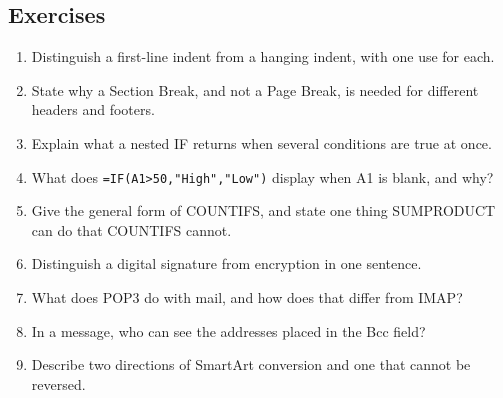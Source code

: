 \documentclass[11pt]{article}
\begin{document}
\subsection*{Exercises}
\begin{enumerate}[label=\arabic*.]
  \item Distinguish a first-line indent from a hanging indent, with one use
    for each.
  \item State why a Section Break, and not a Page Break, is needed for
    different headers and footers.
  \item Explain what a nested IF returns when several conditions are true at
    once.
  \item What does \texttt{=IF(A1>50,"High","Low")} display when A1 is blank,
    and why?
  \item Give the general form of COUNTIFS, and state one thing SUMPRODUCT can
    do that COUNTIFS cannot.
  \item Distinguish a digital signature from encryption in one sentence.
  \item What does POP3 do with mail, and how does that differ from IMAP?
  \item In a message, who can see the addresses placed in the Bcc field?
  \item Describe two directions of SmartArt conversion and one that cannot be
    reversed.
\end{enumerate}
\end{document}
